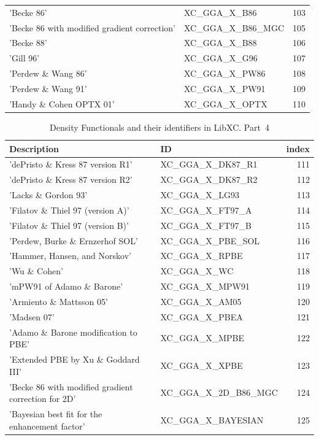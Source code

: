 \documentclass[final,12pt,makeidx,DIV=calc]{article}
\begin{document}
{{{\begin{table}[!h]
\begin{center}
\begin{tabular}{llr}
  'Becke 86' & XC\_GGA\_X\_B86  &103\\
  'Becke 86 with modified gradient correction' & XC\_GGA\_X\_B86\_MGC  &105\\
  'Becke 88' & XC\_GGA\_X\_B88  &106\\
  'Gill 96' & XC\_GGA\_X\_G96  &107\\
  'Perdew \& Wang 86' & XC\_GGA\_X\_PW86  &108\\
  'Perdew \& Wang 91' & XC\_GGA\_X\_PW91  &109\\
  'Handy \& Cohen OPTX 01' & XC\_GGA\_X\_OPTX  &110\\
\hline
\hline
\end{tabular}
\end{center}
\end{table}

\begin{table}[!h]
\caption{Density Functionals and their identifiers in LibXC. Part~4}
\begin{center}
\begin{tabular}{llr}
\hline
\hline
Description & ID & index\\
\hline
  'dePristo \& Kress 87 version R1' & XC\_GGA\_X\_DK87\_R1  &111\\
  'dePristo \& Kress 87 version R2' & XC\_GGA\_X\_DK87\_R2  &112\\
  'Lacks \& Gordon 93' & XC\_GGA\_X\_LG93  &113\\
  'Filatov \& Thiel 97 (version A)' & XC\_GGA\_X\_FT97\_A  &114\\
  'Filatov \& Thiel 97 (version B)' & XC\_GGA\_X\_FT97\_B  &115\\
  'Perdew, Burke \& Ernzerhof SOL' & XC\_GGA\_X\_PBE\_SOL  &116\\
  'Hammer, Hansen, and Norskov' & XC\_GGA\_X\_RPBE  &117\\
  'Wu \& Cohen' & XC\_GGA\_X\_WC  &118\\
  'mPW91 of Adamo \& Barone' & XC\_GGA\_X\_MPW91  &119\\
  'Armiento \& Mattsson 05' & XC\_GGA\_X\_AM05  &120\\
  'Madsen 07' & XC\_GGA\_X\_PBEA  &121\\
  'Adamo \& Barone modification to PBE' & XC\_GGA\_X\_MPBE  &122\\
  'Extended PBE by Xu \& Goddard III' & XC\_GGA\_X\_XPBE  &123\\
  'Becke 86 with modified gradient correction for 2D' & XC\_GGA\_X\_2D\_B86\_MGC  &124\\
  'Bayesian best fit for the enhancement factor' & XC\_GGA\_X\_BAYESIAN  &125\\

\end{tabular}
\end{center}
\end{table}}}}
\end{document}
